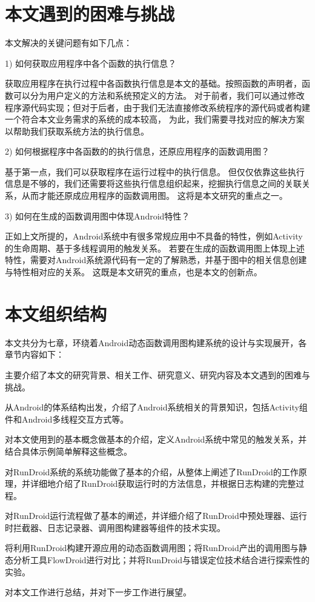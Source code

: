 \section{本文遇到的困难与挑战}


本文解决的关键问题有如下几点：

1)	如何获取应用程序中各个函数的执行信息？

获取应用程序在执行过程中各函数执行信息是本文的基础。按照函数的声明者，函数可以分为用户定义的方法和系统预定义的方法。
对于前者，我们可以通过修改程序源代码实现；但对于后者，由于我们无法直接修改系统程序的源代码或者构建一个符合本文业务需求的系统的成本较高，
为此，我们需要寻找对应的解决方案以帮助我们获取系统方法的执行信息。

2)	如何根据程序中各函数的的执行信息，还原应用程序的函数调用图？

基于第一点，我们可以获取程序在运行过程中的执行信息。
但仅仅依靠这些执行信息是不够的，我们还需要将这些执行信息组织起来，挖掘执行信息之间的关联关系，从而才能还原成应用程序的函数调用图。
这将是本文研究的重点之一。

3)	如何在生成的函数调用图中体现Android特性？

正如上文所提的，Android系统中有很多常规应用中不具备的特性，例如Activity的生命周期、基于多线程调用的触发关系。
若要在生成的函数调用图上体现上述特性，需要对Android系统源代码有一定的了解熟悉，并基于图中的相关信息创建与特性相对应的关系。
这既是本文研究的重点，也是本文的创新点。


\section{本文组织结构}


本文共分为七章，环绕着Android动态函数调用图构建系统的设计与实现展开，各章节内容如下：

主要介绍了本文的研究背景、相关工作、研究意义、研究内容及本文遇到的困难与挑战。

从Android的体系结构出发，介绍了Android系统相关的背景知识，包括Activity组件和Android多线程交互方式等。

对本文使用到的基本概念做基本的介绍，定义Android系统中常见的触发关系，并结合具体示例简单解释这些概念。


对RunDroid系统的系统功能做了基本的介绍，从整体上阐述了RunDroid的工作原理，并详细地介绍了RunDroid获取运行时的方法信息，并根据日志构建\ecg 的完整过程。


对RunDroid运行流程做了基本的阐述，并详细介绍了RunDroid中预处理器、运行时拦截器、日志记录器、调用图构建器等组件的技术实现。

 将利用RunDroid构建开源应用的动态函数调用图；将RunDroid产出的调用图与静态分析工具FlowDroid进行对比；并将RunDroid与错误定位技术结合进行探索性的实验。

对本文工作进行总结，并对下一步工作进行展望。



